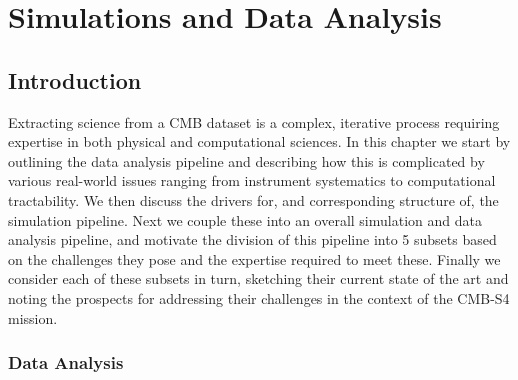  
\chapter{Simulations and Data Analysis}
\renewcommand*\thesection{\arabic{section}}


\section{Introduction}

Extracting science from a CMB dataset is a complex, iterative process requiring expertise in both physical and computational sciences. In this chapter we start by outlining the data analysis pipeline and describing how this is complicated by various real-world issues ranging from instrument systematics to computational tractability. We then discuss the drivers for, and corresponding structure of, the simulation pipeline. Next we couple these into an overall simulation and data analysis pipeline, and motivate the division of this pipeline into 5 subsets based on the challenges they pose and the expertise required to meet these. Finally we consider each of these subsets in turn, sketching their current state of the art and noting the prospects for addressing their challenges in the context of the CMB-S4 mission.

\subsection{Data Analysis}


